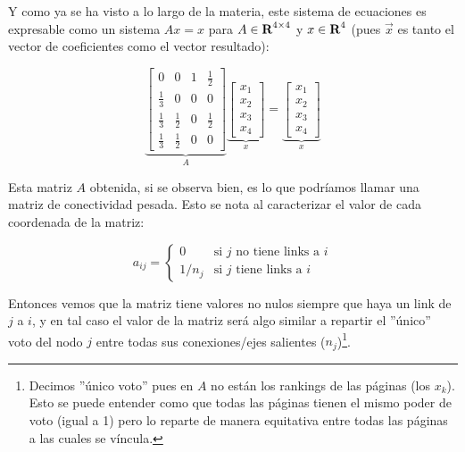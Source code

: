 \par Y como ya se ha visto a lo largo de la materia, este sistema de ecuaciones
es expresable como un sistema $Ax = x$ para $A\in\hbox{\bf R}^{4\times4}$ y
$x\in\hbox{\bf R}^4 $ (pues $\vec{x}$ es tanto el vector de coeficientes
como el vector resultado):

\begin{equation}
    \underbrace{
        \begin{bmatrix}
                0& 0& 1& \frac{1}{2}\\[-0.65em]
                \frac{1}{3}& 0& 0& 0\\[-0.65em]
                \frac{1}{3}& \frac{1}{2}& 0& \frac{1}{2}\\[-0.65em]
                \frac{1}{3}& \frac{1}{2}& 0& 0
        \end{bmatrix}
    }_A
    \underbrace{
        \begin{bmatrix}
            x_1\\[-0.65em]
            x_2\\[-0.65em]
            x_3\\[-0.65em]
            x_4
        \end{bmatrix}
    }_x
    =
    \underbrace{
        \begin{bmatrix}
            x_1\\[-0.65em]
            x_2\\[-0.65em]
            x_3\\[-0.65em]
            x_4
        \end{bmatrix}
    }_x
\end{equation}

\par Esta matriz $A$ obtenida, si se observa bien, es lo que podr\'iamos llamar
una matriz de conectividad pesada. Esto se nota al caracterizar el valor de cada
coordenada de la matriz:

\begin{equation}
    a_{ij} =
    \begin{cases}
        0       &\text{si $j$ no tiene links a $i$}\\
        1/n_j   &\text{si $j$ tiene links a $i$}
    \end{cases}
\end{equation}

\par Entonces vemos que la matriz tiene valores no nulos siempre que haya un
link de $j$ a $i$, y en tal caso el valor de la matriz ser\'a algo similar a
repartir el ''\'unico'' voto del nodo $j$ entre todas sus conexiones/ejes
salientes ($n_j$)\footnote{Decimos ''\'unico voto'' pues en $A$ no est\'an los
rankings de las p\'aginas (los $x_k$). Esto se puede entender como que todas las
p\'aginas tienen el mismo poder de voto (igual a 1) pero lo reparte de manera
equitativa entre todas las p\'aginas a las cuales se v\'incula.}.
\medskip

